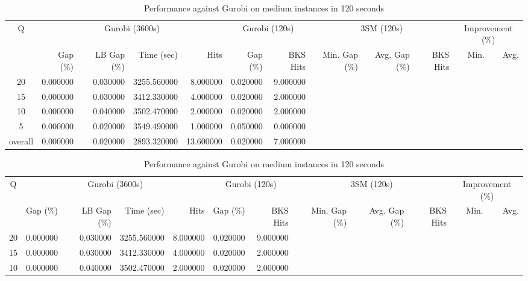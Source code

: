 \begin{table}[H]
\caption{Performance against Gurobi on medium instances in 120 seconds}
\label{tab:3lm_resuts150T120}
\begin{tabular}{c rrrr rr rrr rr}
\toprule
Q & \multicolumn{4}{c}{Gurobi (3600s)} & \multicolumn{2}{c}{Gurobi (120s)} & \multicolumn{3}{c}{3SM (120s)} & \multicolumn{2}{c}{Improvement (\%)} \\
 & Gap (\%) & LB Gap (\%) & Time (sec) & Hits & Gap (\%) & BKS Hits & Min. Gap (\%) & Avg. Gap (\%) & BKS Hits & Min. & Avg. \\
\midrule
\cmidrule(lr){1-1} \cmidrule(lr){2-5} \cmidrule(lr){2-5} \cmidrule(lr){6-7} \cmidrule(lr){8-10} \cmidrule(lr){11-12}
20 & 0.000000 & 0.030000 & 3255.560000 & 8.000000 & 0.020000 & 9.000000 &  &  &  &  &  \\
15 & 0.000000 & 0.030000 & 3412.330000 & 4.000000 & 0.020000 & 2.000000 &  &  &  &  &  \\
10 & 0.000000 & 0.040000 & 3502.470000 & 2.000000 & 0.020000 & 2.000000 &  &  &  &  &  \\
5 & 0.000000 & 0.020000 & 3549.490000 & 1.000000 & 0.050000 & 0.000000 &  &  &  &  &  \\
\midrule
overall & 0.000000 & 0.020000 & 2893.320000 & 13.600000 & 0.020000 & 7.000000 &  &  &  &  &  \\
\bottomrule
\end{tabular}
\end{table}\begin{table}[H]
\caption{Performance against Gurobi on medium instances in 120 seconds}
\label{tab:3lm_resuts150T120}
\begin{tabular}{c rrrr rr rrr rr}
\toprule
Q & \multicolumn{4}{c}{Gurobi (3600s)} & \multicolumn{2}{c}{Gurobi (120s)} & \multicolumn{3}{c}{3SM (120s)} & \multicolumn{2}{c}{Improvement (\%)} \\
 & Gap (\%) & LB Gap (\%) & Time (sec) & Hits & Gap (\%) & BKS Hits & Min. Gap (\%) & Avg. Gap (\%) & BKS Hits & Min. & Avg. \\
\midrule
\cmidrule(lr){1-1} \cmidrule(lr){2-5} \cmidrule(lr){2-5} \cmidrule(lr){6-7} \cmidrule(lr){8-10} \cmidrule(lr){11-12}
20 & 0.000000 & 0.030000 & 3255.560000 & 8.000000 & 0.020000 & 9.000000 &  &  &  &  &  \\
15 & 0.000000 & 0.030000 & 3412.330000 & 4.000000 & 0.020000 & 2.000000 &  &  &  &  &  \\
10 & 0.000000 & 0.040000 & 3502.470000 & 2.000000 & 0.020000 & 2.000000 &  &  &  &  &  \\

\end{tabular}
\end{table}
